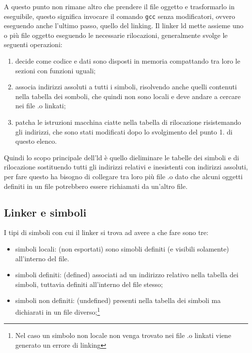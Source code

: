 \documentclass[class=book, crop=false, oneside]{standalone}
\begin{document}
A questo punto non rimane altro che prendere il file oggetto e trasformarlo in eseguibile, questo significa invocare il comando \texttt{gcc} senza modificatori, ovvero eseguendo anche l'ultimo passo, quello del linking.
Il linker ld mette assieme uno o più file oggetto eseguendo le necessarie rilocazioni, generalmente svolge le seguenti operazioni:
\begin{enumerate}
	\item decide come codice e dati sono disposti in memoria compattando tra loro le sezioni con funzioni uguali;
	\item associa indirizzi assoluti a tutti i simboli, risolvendo anche quelli contenuti nella tabella dei somboli, che quindi non sono locali e deve andare a cercare nei file .o linkati;
	\item patcha le istruzioni macchina ciatte nella tabella di rilocazione risistemando gli indirizzi, che sono stati modificati dopo lo svolgimento del punto 1. di questo elenco.
\end{enumerate}

Quindi lo scopo principale dell'ld è quello dieliminare le tabelle dei simboli e di rilocazione sostituendo tutti gli indirizzi relativi e inesistenti con indirizzi assoluti, per fare questo ha bisogno di collegare tra loro più file .o dato che alcuni oggetti definiti in un file potrebbero essere richiamati da un'altro file.

\subsection{Linker e simboli}

I tipi di simboli con cui il linker si trova ad avere a che fare sono tre:
\begin{itemize}
	\item simboli locali: (non esportati) sono simobli definiti (e visibili solamente) all'interno del file.
	\item simboli definiti: (defined) associati ad un indirizzo relativo nella tabella dei simboli, tuttavia definiti all'interno del file stesso;
	\item simboli non definiti: (undefined) presenti nella tabella dei simboli ma dichiarati in un file diverso;\footnote{Nel caso un simbolo non locale non venga trovato nei file .o linkati viene generato un errore di linking}
\end{itemize}
\end{document}

